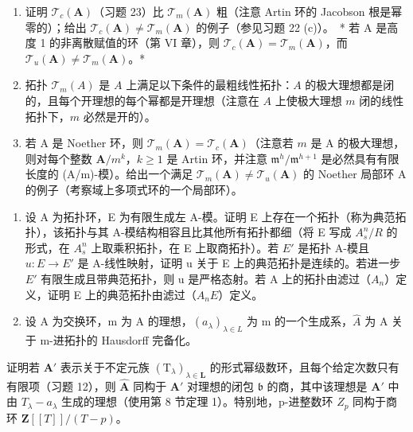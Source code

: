 \begin{enumerate}
\def\labelenumi{(\alph{enumi})}
\item
  证明 \(\mathcal{T}_c(\mathbf{A})\)（习题 23）比 \(\mathcal{T}_m(\mathbf{A})\) 粗（注意 Artin 环的 Jacobson 根是幂零的）；给出 \(\mathcal{T}_c(\mathbf{A}) \neq \mathcal{T}_m(\mathbf{A})\) 的例子（参见习题 22 (c)）。~* 若 A 是高度 1 的非离散赋值的环（第 VI 章），则 \(\mathcal{T}_c(\mathbf{A}) = \mathcal{T}_m(\mathbf{A})\)，而 \(\mathcal{T}_u(\mathbf{A}) \neq \mathcal{T}_m(\mathbf{A})\)。*
\item
  拓扑 \(\mathcal{T}_m(A)\) 是 \(A\) 上满足以下条件的最粗线性拓扑：\(A\) 的极大理想都是闭的，且每个开理想的每个幂都是开理想（注意在 \(A\) 上使极大理想 \(m\) 闭的线性拓扑下，\(m\) 必然是开的）。
\item
  若 A 是 Noether 环，则 \(\mathcal{T}_{m}(\mathbf{A}) = \mathcal{T}_{c}(\mathbf{A})\)（注意若 \(m\) 是 A 的极大理想，则对每个整数 \(\mathbf{A} / m^{k}\)，\(k \geqslant 1\) 是 Artin 环，并注意 \(\mathfrak{m}^h / \mathfrak{m}^{h+1}\) 是必然具有有限长度的 (A/m)-模）。给出一个满足 \(\mathcal{T}_{m}(\mathbf{A}) \neq \mathcal{T}_{u}(\mathbf{A})\) 的 Noether 局部环 A 的例子（考察域上多项式环的一个局部环）。
\end{enumerate}

\begin{enumerate}
\def\labelenumi{\arabic{enumi}.}
\setcounter{enumi}{24}
\item
  设 A 为拓扑环，E 为有限生成左 A-模。证明 E 上存在一个拓扑（称为典范拓扑），该拓扑与其 A-模结构相容且比其他所有拓扑都细（将 E 写成 \(A_{s}^{n}/R\) 的形式，在 \(A_{s}^{n}\) 上取乘积拓扑，在 E 上取商拓扑）。若 \(E'\) 是拓扑 A-模且 \(u: E \to E'\) 是 A-线性映射，证明 u 关于 E 上的典范拓扑是连续的。若进一步 \(E'\) 有限生成且带典范拓扑，则 u 是严格态射。若 A 上的拓扑由滤过（\(A_{n}\)）定义，证明 E 上的典范拓扑由滤过（\(A_{n}E\)）定义。
\item
  设 A 为交换环，m 为 A 的理想，\((a_{\lambda})_{\lambda \in L}\) 为 m 的一个生成系，\(\hat{A}\) 为 A 关于 m-进拓扑的 Hausdorff 完备化。
\end{enumerate}

 证明若 \(\mathbf{A}'\) 表示关于不定元族 \((\mathrm{T}_{\lambda})_{\lambda \in \mathbf{L}}\) 的形式幂级数环，且每个给定次数只有有限项（习题 12），则 \(\hat{\mathbf{A}}\) 同构于 \(\mathbf{A}'\) 对理想的闭包 \(\mathfrak{b}\) 的商，其中该理想是 \(\mathbf{A}'\) 中由 \(T_{\lambda} - a_{\lambda}\) 生成的理想（使用第 8 节定理 1）。特别地，p-进整数环 \(Z_{p}\) 同构于商环 \(\mathbf{Z}[[T]]/(T-p)\)。

